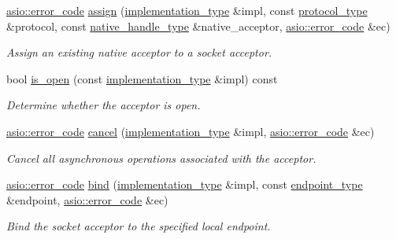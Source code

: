 \begin{DoxyCompactItemize}
\hyperlink{classasio_1_1error__code}{asio\+::error\+\_\+code} \hyperlink{classasio_1_1socket__acceptor__service_abf3215370cf9133cdc0a3b7a59535acf}{assign} (\hyperlink{classasio_1_1socket__acceptor__service_ae91b355a38c59424f68df71fcd9fffb8}{implementation\+\_\+type} \&impl, const \hyperlink{classasio_1_1socket__acceptor__service_a2622e1b415ef0257f92e1d586cc25641}{protocol\+\_\+type} \&protocol, const \hyperlink{classasio_1_1socket__acceptor__service_a48826fea49fd08ba8d3ee51697f1a092}{native\+\_\+handle\+\_\+type} \&native\+\_\+acceptor, \hyperlink{classasio_1_1error__code}{asio\+::error\+\_\+code} \&ec)
\begin{DoxyCompactList}\small\item\em Assign an existing native acceptor to a socket acceptor. \end{DoxyCompactList}\item 
bool \hyperlink{classasio_1_1socket__acceptor__service_a95fc7e13258e56dc058dbde04998d0a4}{is\+\_\+open} (const \hyperlink{classasio_1_1socket__acceptor__service_ae91b355a38c59424f68df71fcd9fffb8}{implementation\+\_\+type} \&impl) const 
\begin{DoxyCompactList}\small\item\em Determine whether the acceptor is open. \end{DoxyCompactList}\item 
\hyperlink{classasio_1_1error__code}{asio\+::error\+\_\+code} \hyperlink{classasio_1_1socket__acceptor__service_a9bf1511bc47356299ae87361b0bdc40f}{cancel} (\hyperlink{classasio_1_1socket__acceptor__service_ae91b355a38c59424f68df71fcd9fffb8}{implementation\+\_\+type} \&impl, \hyperlink{classasio_1_1error__code}{asio\+::error\+\_\+code} \&ec)
\begin{DoxyCompactList}\small\item\em Cancel all asynchronous operations associated with the acceptor. \end{DoxyCompactList}\item 
\hyperlink{classasio_1_1error__code}{asio\+::error\+\_\+code} \hyperlink{classasio_1_1socket__acceptor__service_a2a0f10879dbee26a2ad837ff5979867c}{bind} (\hyperlink{classasio_1_1socket__acceptor__service_ae91b355a38c59424f68df71fcd9fffb8}{implementation\+\_\+type} \&impl, const \hyperlink{classasio_1_1socket__acceptor__service_a2e266541d8da5db4af397b4a62bc3923}{endpoint\+\_\+type} \&endpoint, \hyperlink{classasio_1_1error__code}{asio\+::error\+\_\+code} \&ec)
\begin{DoxyCompactList}\small\item\em Bind the socket acceptor to the specified local endpoint. \end{DoxyCompactList}\item 

\end{DoxyCompactItemize}
